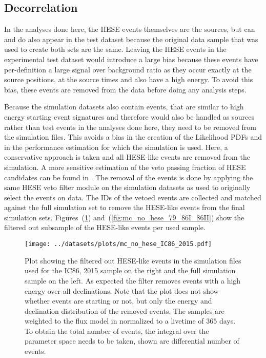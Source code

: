 \subsection{Decorrelation}
In the analyses done here, the HESE events themselves are the sources, but can and do also appear in the test dataset because the original data sample that was used to create both sets are the same.
Leaving the HESE events in the experimental test dataset would introduce a large bias because these events have per-definition a large signal over background ratio as they occur exactly at the source positions, at the source times and also have a high energy.
To avoid this bias, these events are removed from the data before doing any analysis steps.

Because the simulation datasets also contain events, that are similar to high energy starting event signatures and therefore would also be handled as sources rather than test events in the analyses done here, they need to be removed from the simulation files.
This avoids a bias in the creation of the Likelihood PDFs and in the performance estimation for which the simulation is used.
Here, a conservative approach is taken and all HESE-like events are removed from the simulation.
A more sensitive estimation of the veto passing fraction of HESE candidates can be found in \cite{Arguelles:2018awr}.
The removal of the events is done by applying the same HESE veto filter module on the simulation datasets as used to originally select the events on data.
The IDs of the vetoed events are collected and matched against the full simulation set to remove the HESE-like events from the final simulation sets.
Figures~(\ref{fig:mc_no_hese_86V}) and~(\ref{fig:mc_no_hese_79_86I_86II}) show the filtered out subsample of the HESE-like events per used sample.

\begin{figure}[htbp]
  \centering
  \texttt{[image: ../datasets/plots/mc\_no\_hese\_IC86\_2015.pdf]}
  \caption[HESE decorrelation for IC86, 2015]{
    Plot showing the filtered out HESE-like events in the simulation files used for the IC86, 2015 sample on the right and the full simulation sample on the left.
    As expected the filter removes events with a high energy over all declinations.
    Note that the plot does not show whether events are starting or not, but only the energy and declination distribution of the removed events.
    The samples are weighted to the flux model in \cite{Haack:2017dxi} normalized to a livetime of $365$ days.
    To obtain the total number of events, the integral over the parameter space needs to be taken, shown are differential number of events.
    }
  \label{fig:mc_no_hese_86V}
\end{figure}

